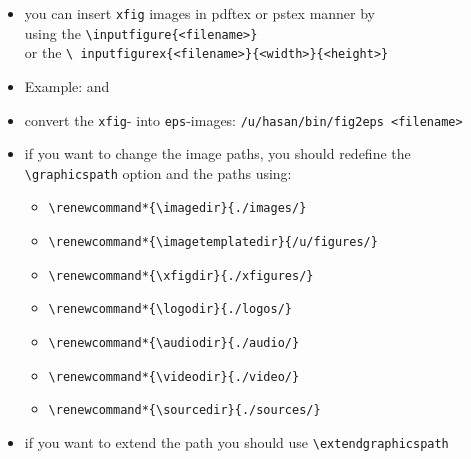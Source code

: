 \documentclass[11pt, a4paper, landscape]{article}
\begin{document}
\NewPage{}
\vfill
\begin{itemize}
\item you can insert \texttt{xfig} images in pdftex or pstex manner by \\ using the 
  \texttt{\textbackslash inputfigure\{<filename>\}} \\ or the \texttt{\textbackslash
    inputfigurex\{<filename>\}\{<width>\}\{<height>\}}
\item Example:
   and 
\item convert the \texttt{xfig}- into \texttt{eps}-images:  
  \texttt{/u/hasan/bin/fig2eps <filename>}
\item if you want to change the image paths, you should redefine the
  \texttt{\textbackslash graphicspath} option and the paths using:
  \begin{footnotesize}
    \begin{itemize}
    \item[] \texttt{\textbackslash renewcommand*\{\textbackslash imagedir\}\{./images/\}}
    \item[] \texttt{\textbackslash renewcommand*\{\textbackslash imagetemplatedir\}\{/u/figures/\}}
    \item[] \texttt{\textbackslash renewcommand*\{\textbackslash xfigdir\}\{./xfigures/\}}
    \item[] \texttt{\textbackslash renewcommand*\{\textbackslash logodir\}\{./logos/\}}
    \item[] \texttt{\textbackslash renewcommand*\{\textbackslash audiodir\}\{./audio/\}}
    \item[] \texttt{\textbackslash renewcommand*\{\textbackslash videodir\}\{./video/\}}
    \item[] \texttt{\textbackslash renewcommand*\{\textbackslash sourcedir\}\{./sources/\}}
    \end{itemize}
  \end{footnotesize}
\item if you want to \alert{extend} the path you should use
  \texttt{\textbackslash extendgraphicspath}
\end{itemize}
\vfill
\end{document}
